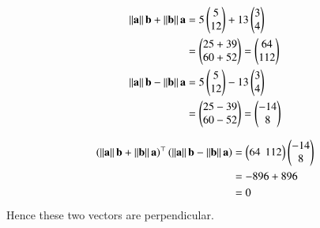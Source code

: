 \documentclass[journal,11pt,twocolumn]{IEEEtran}
\begin{document}
\begin{enumerate}
\begin{align}
	\norm{\vec{a}}\vec{b}+\norm{\vec{b}}\vec{a} &= 5\myvec{5\\ 12} + 13\myvec{3\\ 4}\\
	&=\myvec{25+39\\ 60+52} = \myvec{64\\ 112}\\
	\norm{\vec{a}}\vec{b}-\norm{\vec{b}}\vec{a} &=  5\myvec{5\\ 12} - 13\myvec{3\\ 4}\\
	&=\myvec{25-39\\ 60-52} = \myvec{-14\\ 8}
\end{align}

\begin{align}
	\brak{\norm{\vec{a}}\vec{b}+\norm{\vec{b}}\vec{a}}^{\top}\brak{\norm{\vec{a}}\vec{b}-\norm{\vec{b}}\vec{a}} &= \myvec{64 \hspace{0.15cm} 112}\myvec{-14 \\ 8}\\
	&= -896+896\\
	&= 0
\end{align}
Hence these two vectors are perpendicular.
\end{enumerate}
\end{document}
